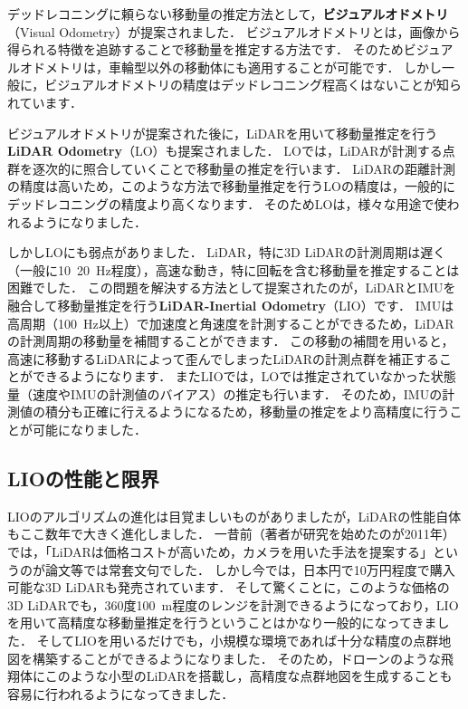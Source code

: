 デッドレコニングに頼らない移動量の推定方法として，{\bf ビジュアルオドメトリ}（Visual Odometry）が提案されました．
ビジュアルオドメトリとは，画像から得られる特徴を追跡することで移動量を推定する方法です．
そのためビジュアルオドメトリは，車輪型以外の移動体にも適用することが可能です．
しかし一般に，ビジュアルオドメトリの精度はデッドレコニング程高くはないことが知られています．

ビジュアルオドメトリが提案された後に，LiDARを用いて移動量推定を行う{\bf LiDAR Odometry}（LO）も提案されました．
LOでは，LiDARが計測する点群を逐次的に照合していくことで移動量の推定を行います．
LiDARの距離計測の精度は高いため，このような方法で移動量推定を行うLOの精度は，一般的にデッドレコニングの精度より高くなります．
そのためLOは，様々な用途で使われるようになりました．

しかしLOにも弱点がありました．
LiDAR，特に3D LiDARの計測周期は遅く（一般に10~20~Hz程度），高速な動き，特に回転を含む移動量を推定することは困難でした．
この問題を解決する方法として提案されたのが，LiDARとIMUを融合して移動量推定を行う{\bf LiDAR-Inertial Odometry}（LIO）です．
IMUは高周期（100~Hz以上）で加速度と角速度を計測することができるため，LiDARの計測周期の移動量を補間することができます．
この移動の補間を用いると，高速に移動するLiDARによって歪んでしまったLiDARの計測点群を補正することができるようになります．
またLIOでは，LOでは推定されていなかった状態量（速度やIMUの計測値のバイアス）の推定も行います．
そのため，IMUの計測値の積分も正確に行えるようになるため，移動量の推定をより高精度に行うことが可能になりました．





\subsection{LIOの性能と限界}

LIOのアルゴリズムの進化は目覚ましいものがありましたが，LiDARの性能自体もここ数年で大きく進化しました．
一昔前（著者が研究を始めたのが2011年）では，「LiDARは価格コストが高いため，カメラを用いた手法を提案する」というのが論文等では常套文句でした．
しかし今では，日本円で10万円程度で購入可能な3D LiDARも発売されています．
そして驚くことに，このような価格の3D LiDARでも，360度100~m程度のレンジを計測できるようになっており，LIOを用いて高精度な移動量推定を行うということはかなり一般的になってきました．
そしてLIOを用いるだけでも，小規模な環境であれば十分な精度の点群地図を構築することができるようになりました．
そのため，ドローンのような飛翔体にこのような小型のLiDARを搭載し，高精度な点群地図を生成することも容易に行われるようになってきました．

